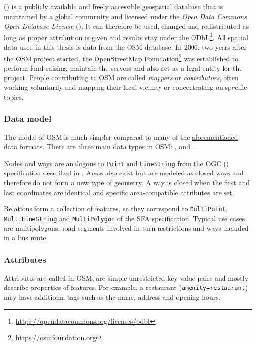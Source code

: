		 () is a publicly available and freely accessible geospatial database that is maintained by a global community and licensed under the \emph{Open Data Commons Open Database License} ()\cite{osm-wiki-about}.
		It can therefore be used, changed and redistributed as long as proper attribution is given and results stay under the ODbL\footnote{\url{https://opendatacommons.org/licenses/odbl}}.
		All spatial data used in this thesis is data from the OSM database.
		In 2006, two years after the OSM project started, the OpenStreetMap Foundation\footnote{\url{https://osmfoundation.org}} was established to perform fund-raising, maintain the servers and also act as a legal entity for the project.
		People contributing to OSM are called \textit{mappers} or \textit{contributors}, often working voluntarily and mapping their local vicinity or concentrating on specific topics.
		
		\subsubsection{Data model}
		
			The model of OSM is much simpler compared to many of the \hyperref[subsec:file-formats]{aforementioned} data formats.
			There are three main data types in OSM: ,  and \cite{osm-wiki-data-model}.
			
			Nodes and ways are analogous to \texttt{Point} and \texttt{LineString} from the OGC  () specification described in .
			Areas also exist but are modeled as closed ways and therefore do not form a new type of geometry.
			A way is closed when the first and last coordinates are identical and specific area-compatible attributes are set.
			
			Relations form a collection of features, so they correspond to \texttt{MultiPoint}, \texttt{MultiLineString} and \texttt{MultiPolygon} of the SFA specification.
			Typical use cases are multipolygons, road segments involved in turn restrictions and ways included in a bus route.
			
		\subsubsection{Attributes}
		\label{subsubsec:osm-attributes}
			
			Attributes are called  in OSM, are simple unrestricted key-value pairs and mostly describe properties of features.
			For example, a restaurant (\texttt{amenity=restaurant}) may have additional tags such as the name, address and opening hours.
			

